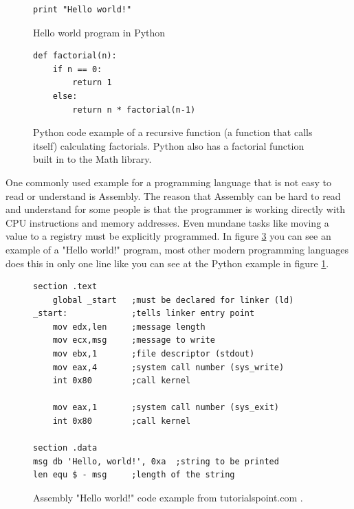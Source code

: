 \documentclass[12pt, a4paper]{article}
\begin{document}
\begin{figure}[!h]
	\begin{lstlisting}
print "Hello world!"
	\end{lstlisting}
	\caption{Hello world program in Python}
	\label{fig:pythonHelloWorld}
\end{figure}

\begin{figure}[!h]
	\begin{lstlisting}
def factorial(n):
    if n == 0:
        return 1
    else:
        return n * factorial(n-1)
	\end{lstlisting}
	\caption{Python code example of a recursive function (a function that calls itself) calculating factorials. Python also has a factorial function built in to the Math library.}
	\label{fig:pythonFactorial}
\end{figure}

\newpage
One commonly used example for a programming language that is not easy to read or understand is Assembly. The reason that Assembly can be hard to read and understand for some people is that the programmer is working directly with CPU instructions and memory addresses. Even mundane tasks like moving a value to a registry must be explicitly programmed. In figure \ref{fig:assemblyExample} you can see an example of a "Hello world!" program, most other modern programming languages does this in only one line like you can see at the Python example in figure \ref{fig:pythonHelloWorld}.\\

\begin{figure}[!h]
	\begin{lstlisting}
section	.text
    global _start   ;must be declared for linker (ld)
_start:	            ;tells linker entry point
    mov	edx,len     ;message length
    mov	ecx,msg     ;message to write
    mov	ebx,1       ;file descriptor (stdout)
    mov	eax,4       ;system call number (sys_write)
    int	0x80        ;call kernel
	
    mov	eax,1       ;system call number (sys_exit)
    int	0x80        ;call kernel

section	.data
msg db 'Hello, world!', 0xa  ;string to be printed
len equ $ - msg     ;length of the string
	\end{lstlisting}
	\caption{Assembly "Hello world!" code example from tutorialspoint.com \cite{tutorialspoint}.}
	\label{fig:assemblyExample}
\end{figure}

\end{document}
